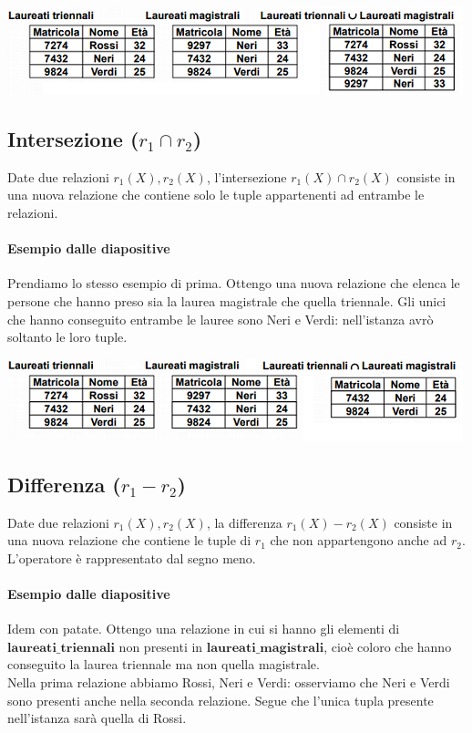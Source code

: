 \begin{center}
	\includegraphics{images/28.PNG}
\end{center}

\subsection{Intersezione ($r_1 \cap r_2$)}
Date due relazioni $r_1(X), r_2(X)$, l'intersezione $r_1(X) \cap r_2(X)$ consiste in una nuova relazione che contiene solo le tuple appartenenti ad entrambe le relazioni.
\paragraph{Esempio dalle diapositive} Prendiamo lo stesso esempio di prima. Ottengo una nuova relazione che elenca le persone che hanno preso sia la laurea magistrale che quella triennale. Gli unici che hanno conseguito entrambe le lauree sono Neri e Verdi: nell'istanza avrò soltanto le loro tuple.
\begin{center}
	\includegraphics{images/29.PNG}
\end{center}
\pagebreak
\subsection{Differenza ($r_1 - r_2$)}
Date due relazioni $r_1(X), r_2(X)$, la differenza $r_1(X)-r_2(X)$ consiste in una nuova relazione che contiene le tuple di $r_1$ che non appartengono anche ad $r_2$. L'operatore è rappresentato dal segno meno.
\paragraph{Esempio dalle diapositive} Idem con patate. Ottengo una relazione in cui si hanno gli elementi di $\mathbf{laureati\_triennali}$ non presenti in $\mathbf{laureati\_magistrali}$, cioè coloro che hanno conseguito la laurea triennale ma non quella magistrale.\\Nella prima relazione abbiamo Rossi, Neri e Verdi: osserviamo che Neri e Verdi sono presenti anche nella seconda relazione. Segue che l'unica tupla presente nell'istanza sarà quella di Rossi.


